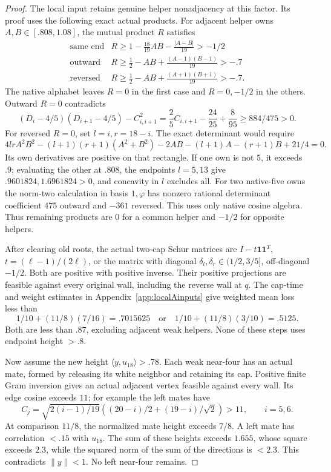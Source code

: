 \documentclass[11pt]{article}
\theoremstyle{definition}
\theoremstyle{remark}
\newcommand{\ip}[2]{\langle #1,#2\rangle}
\newcommand{\norm}[1]{\lVert #1\rVert}
\begin{document}
\begin{proof}
The local input retains genuine helper nonadjacency at this
factor. Its proof uses the following exact actual products.
For adjacent helper owns \(A,B\in[.808,1.08]\), the mutual
product \(R\) satisfies
\[
\begin{array}{c|l}
\text{same end}&R\geq1-\frac{18}{19}AB-\frac{|A-B|}{19}>-1/2\\
\text{outward}&R\geq\frac12-AB+\frac{(A-1)(B-1)}{19}>-.7\\
\text{reversed}&R\geq\frac12-AB+\frac{(A+1)(B+1)}{19}>-.7.
\end{array}
\]
The native alphabet leaves \(R=0\) in the first case and
\(R=0,-1/2\) in the others. Outward \(R=0\) contradicts
\[
 (D_i-4/5)(D_{i+1}-4/5)-C_{i,i+1}^2
 =\frac25 C_{i,i+1}-\frac{24}{25}+\frac8{95}
 \geq884/475>0.
\]
For reversed \(R=0\), set \(l=i,r=18-i\).
The exact determinant would require
\[
 4lr A^2B^2-(l+1)(r+1)(A^2+B^2)-2AB
 -(l+1)A-(r+1)B+21/4=0.
\]
Its own derivatives are positive on that rectangle.
If one own is not \(5\), it exceeds \(.9\); evaluating the
other at \(.808\), the endpoints \(l=5,13\) give
\(.9601824,1.6961824>0\), and concavity in \(l\) excludes all.
For two native-five owns the norm-two calculation in basis
\(1,\varphi\) has nonzero rational determinant coefficient
\(475\) outward and \(-361\) reversed. This uses only native
cosine algebra. Thus remaining products are \(0\) for a
common helper and \(-1/2\) for opposite helpers.

After clearing old roots, the actual two-cap Schur matrices
are \(I-t\mathbf1\mathbf1^T\), \(t=(\ell-1)/(2\ell)\), or
the matrix with diagonal
\(\delta_l,\delta_r\in(1/2,3/5]\), off-diagonal \(-1/2\).
Both are positive with positive inverse. Their positive
projections are feasible against every original wall,
including the reverse wall at \(q\).
The cap-time and weight estimates in Appendix~\ref{app:localAinputs} give
weighted mean loss less than
\[
 1/10+(11/8)(7/16)=.7015625
 \quad\text{or}\quad1/10+(11/8)(3/10)=.5125.
\]
Both are less than \(.87\), excluding adjacent weak helpers.
None of these steps uses endpoint height \(>.8\).

Now assume the new height \(\ip{y}{u_{18}}>.78\).
Each weak near-four has an actual mate, formed by releasing
its white neighbor and retaining its cap. Positive finite
Gram inversion gives an actual adjacent vertex feasible
against every wall. Its edge cosine exceeds \(11\);
for example the left mates have
\[
 C_j=\sqrt{2(i-1)/19}
 \left((20-i)/2+(19-i)/\sqrt2\right)>11,\qquad i=5,6.
\]
At comparison \(11/8\), the normalized mate height exceeds
\(7/8\). A left mate has correlation \(<.15\) with \(u_{18}\).
The sum of these heights exceeds \(1.655\), whose square
exceeds \(2.3\), while the squared norm of the sum of the
directions is \(<2.3\). This contradicts \(\norm{y}<1\).
No left near-four remains.


\end{proof}
\end{document}
